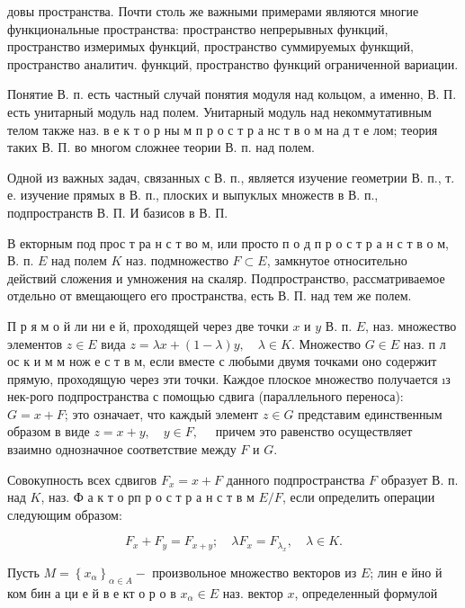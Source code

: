 \documentclass[10pt]{article}
\begin{document}
довы пространства. Почти столь же важными примерами являются многие функциональные пространства: пространство непрерывных функций, пространство измеримых функций, пространство суммируемых функщий, пространство аналитич. функций, пространство функций ограниченной вариации.



Понятие В. п. есть частный случай понятия модуля над кольцом, а именно, В. П. есть унитарный модуль над полем. Унитарный модуль над некоммутативным телом также наз. в е к т о р ны м п р о с т р а нс т в о м на д т е лом; теория таких В. П. во многом сложнее теории В. п. над полем.



Одной из важных задач, связанных с В. п., является изучение геометрии В. п., т. е. изучение прямых в В. п., плоских и выпуклых множеств в В. п., подпространств В. П. И базисов в В. П.



В екторным под прос т ра н с т во м, или просто п о д п р о с т р а н с т в о м, В. п. $E$ над полем $K$ наз. подмножество $F \subset E$, замкнутое относительно действий сложения и умножения на скаляр. Подпространство, рассматриваемое отдельно от вмещающего его пространства, есть В. П. над тем же полем.



П р я м о й ли ни е й, проходящей через две точки $x$ и $y$ В. п. $E$, наз. множество элементов $z \in E$ вида $z=\lambda x+(1-\lambda) y, \quad \lambda \in K$. Множество $G \in E$ наз. п л ос к и м м нож е с т в м, если вместе с любыми двумя точками оно содержит прямую, проходящую через эти точки. Каждое плоское множество получается ıз нек-рого подпространства с помощью сдвига (параллельного переноса): $G=x+F$; это означает, что каждый элемент $z \in G$ представим единственным образом в виде $z=x+y, \quad y \in F, \quad$ причем это равенство осуществляет взаимно однозначное соответствие между $F$ и $G$.



Совокупность всех сдвигов $F_{x}=x+F$ данного подпространства $F$ образует В. п. над $K$, наз. Ф а к т о рп р о с т р а н с т в м $E / F$, если определить операции следующим образом:



\[

F_{x}+F_{y}=F_{x+y} ; \quad \lambda F_{x}=F_{\lambda_{x}}, \quad \lambda \in K .

\]



Пусть $M=\left\{x_{\alpha}\right\}_{\alpha \in A}-$ произвольное множество векторов из $E$; лин е йно й ком бин а ци е й в е кт о р о в $x_{\alpha} \in E$ наз. вектор $x$, определенный формулой
\end{document}
